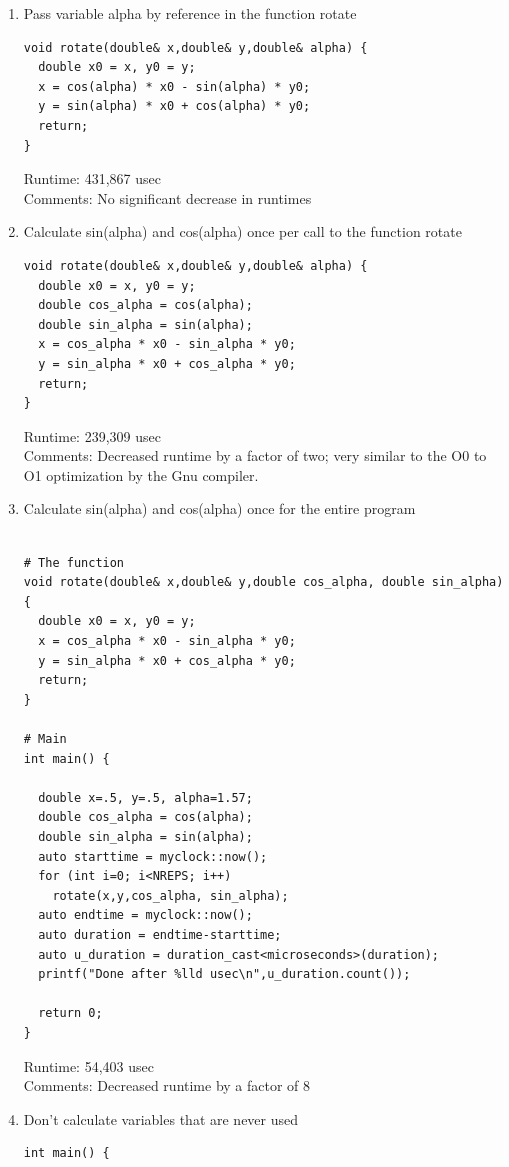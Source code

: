 \documentclass{report}
\begin{document}
\begin{enumerate}

\item Pass variable alpha by reference in the function rotate
\begin{lstlisting}
void rotate(double& x,double& y,double& alpha) {
  double x0 = x, y0 = y;
  x = cos(alpha) * x0 - sin(alpha) * y0;
  y = sin(alpha) * x0 + cos(alpha) * y0;
  return;
}
\end{lstlisting}
Runtime: 431,867 usec
\\Comments: No significant decrease in runtimes

\vspace{12pt}
\item Calculate sin(alpha) and cos(alpha) once per call to the function rotate
\begin{lstlisting}
void rotate(double& x,double& y,double& alpha) {
  double x0 = x, y0 = y;
  double cos_alpha = cos(alpha);
  double sin_alpha = sin(alpha);
  x = cos_alpha * x0 - sin_alpha * y0;
  y = sin_alpha * x0 + cos_alpha * y0;
  return;
}
\end{lstlisting}
Runtime: 239,309 usec
\\Comments: Decreased runtime by a factor of two; very similar to the O0 to O1 optimization by the Gnu compiler.

\vspace{12pt}
\item Calculate sin(alpha) and cos(alpha) once for the entire program
\begin{lstlisting}

# The function
void rotate(double& x,double& y,double cos_alpha, double sin_alpha) {
  double x0 = x, y0 = y;
  x = cos_alpha * x0 - sin_alpha * y0;
  y = sin_alpha * x0 + cos_alpha * y0;
  return;
}

# Main
int main() {

  double x=.5, y=.5, alpha=1.57;
  double cos_alpha = cos(alpha);
  double sin_alpha = sin(alpha);
  auto starttime = myclock::now();
  for (int i=0; i<NREPS; i++)
    rotate(x,y,cos_alpha, sin_alpha);
  auto endtime = myclock::now();
  auto duration = endtime-starttime;
  auto u_duration = duration_cast<microseconds>(duration);
  printf("Done after %lld usec\n",u_duration.count());

  return 0;
}
\end{lstlisting}
Runtime: 54,403 usec
\\Comments: Decreased runtime by a factor of 8

\vspace{12pt}
\item Don’t calculate variables that are never used
\begin{verbatim}
int main() {


\end{verbatim}
\end{enumerate}
\end{document}
